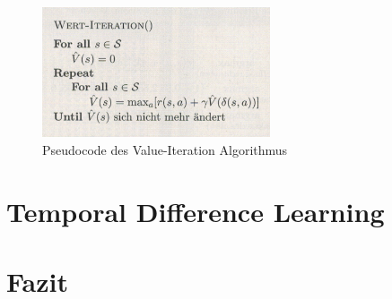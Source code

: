 \documentclass[10pt]{scrartcl}
\begin{document}
\begin{figure}[htc]
    \centering
    \includegraphics[width=0.6\textwidth]{Grafiken/value-iteration.png}
    \caption{Pseudocode des Value-Iteration Algorithmus}
    \label{valueiteration}
\end{figure}

\section{Temporal Difference Learning}

\section{Fazit}
\end{document}
